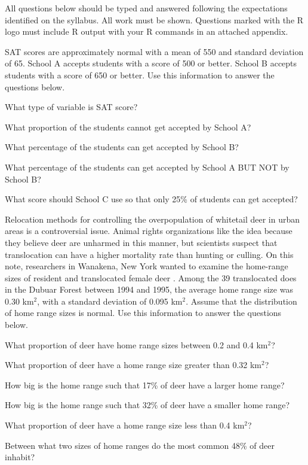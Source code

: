 \documentclass[10pt,openany]{book}\usepackage[]{graphicx}\usepackage[]{color}
\begin{document}
\newpage
\begin{hwsection}{All questions below should be typed and answered following the expectations identified on the syllabus.  All work must be shown.  Questions marked with the R logo must include R output with your R commands in an attached appendix.}

  \item \label{hwprob:quNormSAT} \rhw{} SAT scores are approximately normal with a mean of 550 and standard deviation of 65.  School A accepts students with a score of 500 or better.  School B accepts students with a score of 650 or better.  Use this information to answer the questions below.
  \begin{Enumerate}
    \item What type of variable is SAT score?
    \item What proportion of the students cannot get accepted by School A?
    \item What percentage of the students can get accepted by School B?
    \item What percentage of the students can get accepted by School A BUT NOT by School B?
    \item What score should School C use so that only 25\% of students can get accepted?
  \end{Enumerate}

  \item \label{hwprob:quNormDeerRelocation} \rhw{} Relocation methods for controlling  the overpopulation of whitetail deer in urban areas is a controversial issue.  Animal rights organizations like the idea because they believe deer are unharmed in this manner, but scientists suspect that translocation can have a higher mortality rate than hunting or culling.  On this note, researchers in Wanakena, New York wanted to examine the home-range sizes of resident and translocated female deer \citep{Jonesetal1997}.  Among the 39 translocated does in the Dubuar Forest between 1994 and 1995, the average home range size was 0.30 km$^{2}$, with a standard deviation of 0.095 km$^{2}$.  Assume that the distribution of home range sizes is normal.  Use this information to answer the questions below.
  \begin{Enumerate}
    \item What proportion of deer have home range sizes between 0.2 and 0.4 km$^{2}$?
    \item What proportion of deer have a home range size greater than 0.32 km$^{2}$?
    \item How big is the home range such that 17\% of deer have a larger home range?
    \item How big is the home range such that 32\% of deer have a smaller home range?
    \item What proportion of deer have a home range size less than 0.4 km$^{2}$?
    \item Between what two sizes of home ranges do the most common 48\% of deer inhabit?
  \end{Enumerate}

\end{hwsection}
\end{document}
